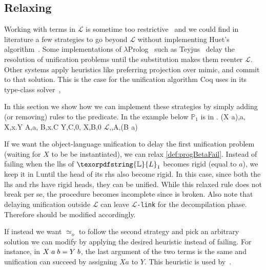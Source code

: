 \documentclass[sigconf,natbib=false,review]{acmart}
\newcommand{\appsep}{\ensuremath{\textcolor{lightgray}{\cdot}}}
\newcommand{\UnifRel}{\ensuremath{\simeq}}
\newcommand{\Uo}{\texorpdfstring{\ensuremath{\UnifRel_o}\xspace}{unif\_o}}
\newcommand{\llambda}{\ensuremath{\mathcal{L}}\xspace}
\newcommand{\linkMacro}[1]{\ensuremath{#1}\texttt{-link}\xspace}
\newcommand{\linkbeta}{\linkMacro{\llambda}}
\newcommand{\lhs}{lhs\xspace}
\newcommand{\rhs}{rhs\xspace}
\newcommand{\linkStore}{\texorpdfstring{\ensuremath{\mathbb{L}}\xspace}{L}}
\newcommand{\foUnifPb}{\ensuremath{\mathbb{P}}\xspace}
\begin{document}
\subsection{\texorpdfstring{Relaxing }{Relaxing progress-llam-fail}}
\label{sec:heuristics}
\newcommand{\progBetaNoLLWait}{\emph{progress-beta-\notllambda}}

Working with terms in \llambda is sometime too restrictive~\cite{Abel2018ExtensionsTM}
and we could find in literature a few strategies to go beyond \llambda without 
implementing Huet's algorithm~\cite{Huet75}.
Some implementations of $\lambda$Prolog~\cite{lamProlog} such as
Teyjus~\cite{Nadathur2001} delay the resolution of \notllambda unification
problems until the substitution makes them reenter \llambda.
Other systems apply heuristics like preferring projection over mimic,
and commit to that solution. This is the case for
the unification algorithm Coq uses in its type-class
solver~\cite{sozeau08}, 

In this section we show how we can implement these strategies
by simply adding (or removing) rules to the
 predicate.
In the example below $\foUnifPb_1$ is in \notllambda.
%
\printAlll
  {{{(X\appsep a),a},
    {X,\lambda x.Y}}}
  {{{A,a},
    {B,\lambda x.C}}}
  {{{Y,C,0},
    {X,B,0}}}
  {{{\llambda,,A,(B\appsep a)}}}

\noindent
If we want the object-language unification to delay the first unification problem
(waiting for $X$ to be be instantiated),
we can relax \cref{def:progBetaFail}. 
Instead of failing when the \lhs of $\linkStore_1$ becomes rigid (equal to $a$),
we keep it in \linkStore until the head of its \rhs also become rigid.
In this case, since both the \lhs and \rhs have rigid heads, they can be unified.
While this relaxed rule does not break  per se,
the  procedure becomes incomplete since
 is broken. Also note that delaying unification outside \llambda can leave \linkbeta for the
decompilation phase. Therefore  should
be modified accordingly.

If instead we want \Uo{} to follow the second strategy and pick an
arbitrary solution we can modify \progress by applying the desired heuristic
instead of failing.
For instance, in $X \appsep a \appsep b = Y \appsep b$, the last
argument of the two terms is the same and unification can succeed by assigning
$X a$ to $Y$. This heuristic is used by~\cite{sozeau08}.
\end{document}
